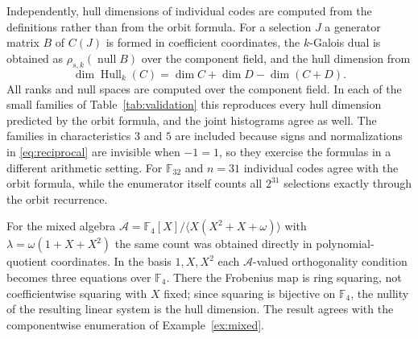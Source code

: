 \documentclass[10pt,a4paper]{article}
\newcommand{\F}{\mathbb F}
\newcommand{\A}{\mathcal A}
\newcommand{\Hull}{\operatorname{Hull}}
\numberwithin{equation}{section}
\theoremstyle{plain}
\theoremstyle{definition}
\theoremstyle{remark}
\begin{document}
Independently, hull dimensions of individual codes are computed from the
definitions rather than from the orbit formula. For a selection $J$ a generator
matrix $B$ of $C(J)$ is formed in coefficient coordinates, the $k$-Galois dual is
obtained as $\rho_{s,k}(\operatorname{null}B)$ over the component field, and the
hull dimension from
\[
\dim\Hull_k(C)=\dim C+\dim D-\dim(C+D).
\]
All ranks and null spaces are computed over the component field. In each of the
small families of Table~\ref{tab:validation} this reproduces every hull dimension
predicted by the orbit formula, and the joint histograms agree as well. The
families in characteristics $3$ and $5$ are included because signs and
normalizations in \eqref{eq:reciprocal} are invisible when $-1=1$, so they
exercise the formulas in a different arithmetic setting. For $\F_{32}$ and
$n=31$ individual codes agree with the orbit formula, while the enumerator itself
counts all $2^{31}$ selections exactly through the orbit recurrence.

For the mixed algebra $\A=\F_4[X]/\langle X(X^2+X+\omega)\rangle$ with
$\lambda=\omega(1+X+X^2)$ the same count was obtained directly in
polynomial-quotient coordinates. In the basis $1,X,X^2$ each $\A$-valued
orthogonality condition becomes three equations over $\F_4$. There the Frobenius
map is ring squaring, not coefficientwise squaring with $X$ fixed; since squaring
is bijective on $\F_4$, the nullity of the resulting linear system is the hull
dimension. The result agrees with the componentwise enumeration of
Example~\ref{ex:mixed}.
\end{document}
